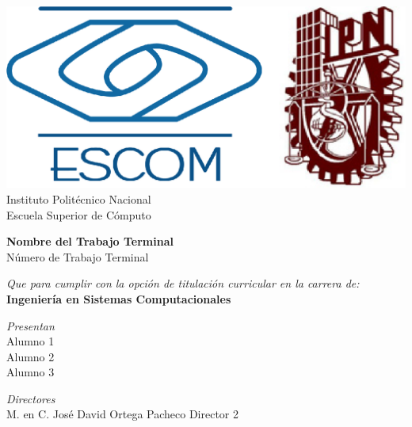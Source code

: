 
\begin{titlepage}

    \centering %

    \includegraphics[scale=0.17]{imagenes/escom-ipn} %
    \LARGE{\\ Instituto Polit\'ecnico Nacional}
    \LARGE{\\ Escuela Superior de C\'omputo}
    
    \vspace{1cm} %

    \LARGE \textbf{ Nombre del Trabajo Terminal}
    \LARGE {\\ Número de Trabajo Terminal}

    \vspace{1cm} %

    \LARGE \textit{Que para cumplir con la opción de titulación curricular en la carrera de:}
    \LARGE \textbf{\\ Ingeniería en Sistemas Computacionales}

    \vspace{1cm} %

   \textit{Presentan}\\
    Alumno 1 \\
    Alumno 2 \\
    Alumno 3

    \vspace{1cm} %

   \textit{Directores}\\
    M. en C. José David Ortega Pacheco \bigskip  Director 2

\end{titlepage}